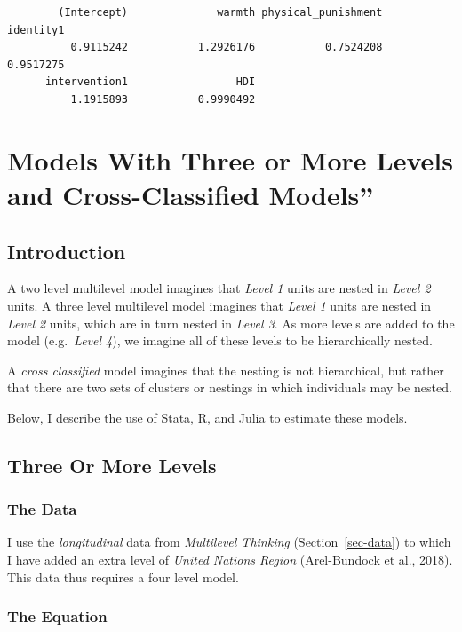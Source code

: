 \documentclass[
  letterpaper,
  DIV=11,
  numbers=noendperiod]{scrreprt}
\begin{document}
\begin{verbatim}
        (Intercept)              warmth physical_punishment           identity1 
          0.9115242           1.2926176           0.7524208           0.9517275 
      intervention1                 HDI 
          1.1915893           0.9990492 
\end{verbatim}


\chapter{Models With Three or More Levels and Cross-Classified
Models''}\label{models-with-three-or-more-levels-and-cross-classified-models}

\section{Introduction}\label{introduction-1}

A two level multilevel model imagines that \emph{Level 1} units are
nested in \emph{Level 2} units. A three level multilevel model imagines
that \emph{Level 1} units are nested in \emph{Level 2} units, which are
in turn nested in \emph{Level 3}. As more levels are added to the model
(e.g.~\emph{Level 4}), we imagine all of these levels to be
hierarchically nested.

A \emph{cross classified} model imagines that the nesting is not
hierarchical, but rather that there are two sets of clusters or nestings
in which individuals may be nested.

Below, I describe the use of Stata, R, and Julia to estimate these
models.

\section{Three Or More Levels}\label{sec-fourlevel}

\subsection{The Data}\label{the-data-2}

I use the \emph{longitudinal} data from \emph{Multilevel Thinking}
(Section~\ref{sec-data}) to which I have added an extra level of
\emph{United Nations Region} (Arel-Bundock et al., 2018). This data thus
requires a four level model.

\subsection{The Equation}\label{the-equation-5}
\end{document}
